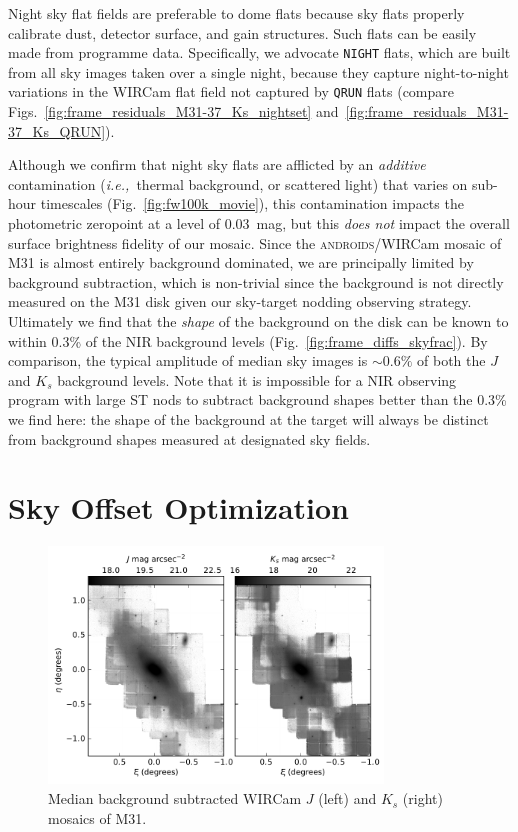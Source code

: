 \documentclass[iop]{emulateapj}
\newcommand{\ie}{\textit{i.e.,~}}
\newcommand{\androids}{\textsc{androids}}
\newcommand{\Fig}[1]{Fig.~\ref{fig:#1}}  %
\begin{document}
Night sky flat fields are preferable to dome flats because sky flats properly calibrate dust, detector surface, and gain structures.
Such flats can be easily made from programme data.
Specifically, we advocate \texttt{NIGHT} flats, which are built from all sky images taken over a single night, because they capture night-to-night variations in the WIRCam flat field not captured by \texttt{QRUN} flats (compare Figs.~\ref{fig:frame_residuals_M31-37_Ks_nightset} and~\ref{fig:frame_residuals_M31-37_Ks_QRUN}).

Although we confirm that night sky flats are afflicted by an \emph{additive} contamination (\ie thermal background, or scattered light) that varies on sub-hour timescales (\Fig{fw100k_movie}), this contamination impacts the photometric zeropoint at a level of $0.03$~mag, but this \emph{does not} impact the overall surface brightness fidelity of our mosaic.
Since the \androids /WIRCam mosaic of M31 is almost entirely background dominated, we are principally limited by background subtraction, which is non-trivial since the background is not directly measured on the M31 disk given our sky-target nodding observing strategy.
Ultimately we find that the \emph{shape} of the background on the disk can be known to within 0.3\% of the NIR background levels (\Fig{frame_diffs_skyfrac}).
By comparison, the typical amplitude of median sky images is $\sim 0.6\%$ of both the $J$ and $K_s$ background levels.
Note that it is impossible for a NIR observing program with large ST nods to subtract background shapes better than the 0.3\% we find here: the shape of the background at the target will always be distinct from background shapes measured at designated sky fields.

\section{Sky Offset Optimization}
\label{sec:scalar}

\begin{figure}[t]
\centering
\includegraphics[width=3.5in]{figs/raw_mosaics}
\caption{Median background subtracted WIRCam $J$ (left) and $K_s$ (right) mosaics of M31.}
\label{fig:raw_mosaics}
\end{figure}
\end{document}
